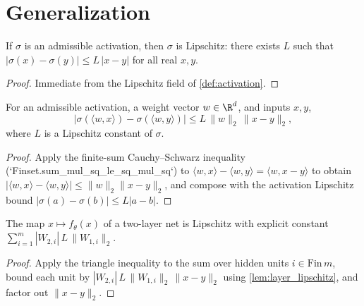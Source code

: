 \chapter{Generalization}

\begin{lemma}\label{lem:lipschitz_gelu}
\leanok
{}
If $\sigma$ is an admissible activation, then $\sigma$ is Lipschitz: there exists $L$ such that $|\sigma(x)-\sigma(y)|\le L\,|x-y|$ for all real $x,y$.
\end{lemma}
\begin{proof}
\leanok
Immediate from the Lipschitz field of \cref{def:activation}.
\end{proof}

\begin{lemma}\label{lem:layer_lipschitz}
\leanok
{}
For an admissible activation, a weight vector $w\in\R^d$, and inputs $x,y$,
\[
\bigl|\sigma(\langle w,x\rangle)-\sigma(\langle w,y\rangle)\bigr|
\le L\,\|w\|_2\,\|x-y\|_2,
\]
where $L$ is a Lipschitz constant of $\sigma$.
\end{lemma}
\begin{proof}
\leanok
Apply the finite-sum Cauchy--Schwarz inequality (`Finset.sum_mul_sq_le_sq_mul_sq`) to $\langle w, x\rangle - \langle w, y\rangle = \langle w, x-y\rangle$ to obtain $|\langle w,x\rangle - \langle w,y\rangle| \le \|w\|_2\|x-y\|_2$, and compose with the activation Lipschitz bound $|\sigma(a)-\sigma(b)|\le L|a-b|$.
\end{proof}

\begin{lemma}\label{lem:forward_lipschitz}
\leanok
{}
The map $x\mapsto f_\theta(x)$ of a two-layer net is Lipschitz with explicit constant $\sum_{i=1}^m |W_{2,i}|\,L\,\|W_{1,i}\|_2$.
\end{lemma}
\begin{proof}
\leanok
Apply the triangle inequality to the sum over hidden units $i\in\mathrm{Fin}\,m$, bound each unit by $|W_{2,i}|\,L\,\|W_{1,i}\|_2\,\|x-y\|_2$ using \cref{lem:layer_lipschitz}, and factor out $\|x-y\|_2$.
\end{proof}

